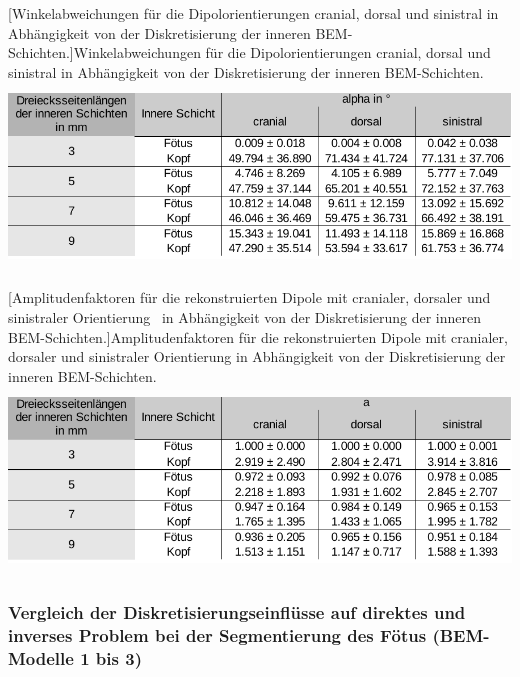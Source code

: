\begin{center}
\begin{minipage}{17cm}
[Winkelabweichungen für die Dipolorientierungen
cranial, dorsal und sinistral in Abhängigkeit von der Diskretisierung
der inneren BEM{}-Schichten.]{Winkelabweichungen für die
Dipolorientierungen cranial, dorsal und sinistral in Abhängigkeit von
der Diskretisierung der inneren BEM-Schichten. }
\label{seq:refTable3}\includegraphics[width=15.035cm,height=4.957cm]{BA-img/BA-img16.pdf}\end{minipage}
\end{center}


\begin{center}
\begin{minipage}{17cm}
[Amplitudenfaktoren für die rekonstruierten Dipole mit
cranialer, dorsaler und sinistraler Orientierung \ in Abhängigkeit von
der Diskretisierung der inneren BEM{}-Schichten.]{Amplitudenfaktoren
für die rekonstruierten Dipole mit cranialer, dorsaler und sinistraler
Orientierung  in Abhängigkeit von der Diskretisierung der inneren
BEM-Schichten. }
\label{seq:refTable4}\includegraphics[width=15.035cm,height=4.957cm]{BA-img/BA-img17.pdf}\end{minipage}
\end{center}
\subsubsection{Vergleich der Diskretisierungseinflüsse auf direktes und
inverses Problem bei der Segmentierung des Fötus (BEM-Modelle 1 bis 3)}
